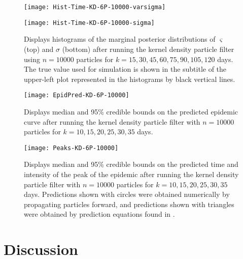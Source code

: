 \documentclass{article}
\begin{document}
\begin{figure}[ht]
\centering
\begin{minipage}[b]{1.0\linewidth}
\texttt{[image: Hist-Time-KD-6P-10000-varsigma]}
\end{minipage}
\begin{minipage}[b]{1.0\linewidth}
\texttt{[image: Hist-Time-KD-6P-10000-sigma]}
\end{minipage}
\caption{Displays histograms of the marginal posterior distributions of $\varsigma$ (top) and $\sigma$ (bottom) after running the kernel density particle filter using $n = 10000$ particles for $k = 15,30,45,60,75,90,105,120$ days.  The true value used for simulation is shown in the subtitle of the upper-left plot represented in the histograms by black vertical lines.} \label{fig:histvarsigmasigma}
\end{figure}

\begin{figure}[ht]
\centering
\texttt{[image: EpidPred-KD-6P-10000]}
\caption{Displays median and 95\% credible bounds on the predicted epidemic curve after running the kernel density particle filter with $n = 10000$ particles for $k = 10,15,20,25,30,35$ days.}
\label{fig:pred}
\end{figure}

\begin{figure}[ht]
\centering
\texttt{[image: Peaks-KD-6P-10000]}
\caption{Displays median and 95\% credible bounds on the predicted time and intensity of the peak of the epidemic after running the kernel density particle filter with $n = 10000$ particles for $k = 10,15,20,25,30,35$ days.  Predictions shown with circles were obtained numerically by propagating particles forward, and predictions shown with triangles were obtained by prediction equations found in \citet{skvortsov2012monitoring}.}
\end{figure}

\clearpage

\section{Discussion \label{sec:discussion}}



\end{document}
